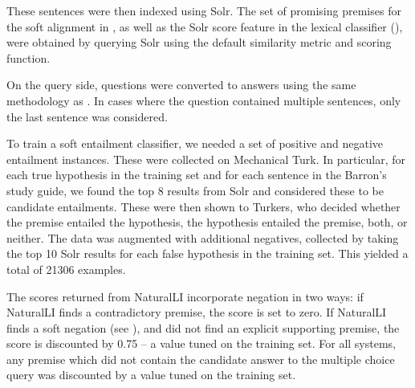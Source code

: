 These sentences were then indexed using Solr.
The set of promising premises for the soft alignment in , as well as
  the Solr score feature in the lexical classifier (),
  were obtained by querying Solr using the default similarity metric and scoring function.

On the query side, questions were converted to answers using the same methodology as
  .
In cases where the question contained multiple sentences, only the last sentence
  was considered.

%
%
To train a soft entailment classifier, we needed a set of positive
  and negative entailment instances.
These were collected on Mechanical Turk. %
In particular, for each true hypothesis in the training set and for each sentence
  in the Barron's study guide, we found the top 8 results from Solr and considered
  these to be candidate entailments.
These were then shown to Turkers, who decided whether the premise entailed the
  hypothesis, the hypothesis entailed the premise, both, or neither.
The data was augmented with additional negatives, collected by taking
  the top 10 Solr results for each false hypothesis in the training set.
This yielded a total of \num{21306} examples.

The scores returned from NaturalLI incorporate negation in two ways:
  if NaturalLI finds a contradictory premise, the score is set to zero.
If NaturalLI finds a soft negation (see ),
  and did not find an explicit supporting premise, the score is discounted
  by 0.75 -- a value tuned on the training set.
For all systems, any premise which did not contain the candidate answer to the
  multiple choice query was discounted by a value tuned on the training
  set.



\def\t#1{\small{#1}}
\def\b#1{\t{\textbf{#1}}}
\def\m#1{\t{\textcolor{darkblue}{#1}}}
\def\c#1{\b{\textcolor{darkblue}{#1}}}
\def\colspaceS{2.0mm}
\def\colspaceM{3.0mm}
\def\colspaceL{5.0mm}


